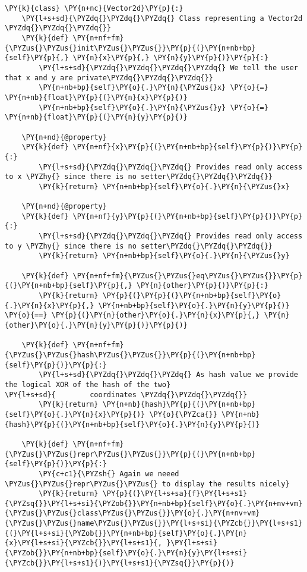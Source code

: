 \begin{Verbatim}[label=\makebox{\url{https://github.com/lucabaldini/cmepda/tree/master/slides/latex/snippets/vector2d\_hashable.py}},commandchars=\\\{\}]
\PY{k}{class} \PY{n+nc}{Vector2d}\PY{p}{:}
    \PY{l+s+sd}{\PYZdq{}\PYZdq{}\PYZdq{} Class representing a Vector2d \PYZdq{}\PYZdq{}\PYZdq{}}
    \PY{k}{def} \PY{n+nf+fm}{\PYZus{}\PYZus{}init\PYZus{}\PYZus{}}\PY{p}{(}\PY{n+nb+bp}{self}\PY{p}{,} \PY{n}{x}\PY{p}{,} \PY{n}{y}\PY{p}{)}\PY{p}{:}
        \PY{l+s+sd}{\PYZdq{}\PYZdq{}\PYZdq{}\PYZdq{} We tell the user that x and y are private\PYZdq{}\PYZdq{}\PYZdq{}}
        \PY{n+nb+bp}{self}\PY{o}{.}\PY{n}{\PYZus{}x} \PY{o}{=} \PY{n+nb}{float}\PY{p}{(}\PY{n}{x}\PY{p}{)}
        \PY{n+nb+bp}{self}\PY{o}{.}\PY{n}{\PYZus{}y} \PY{o}{=} \PY{n+nb}{float}\PY{p}{(}\PY{n}{y}\PY{p}{)}

    \PY{n+nd}{@property}
    \PY{k}{def} \PY{n+nf}{x}\PY{p}{(}\PY{n+nb+bp}{self}\PY{p}{)}\PY{p}{:}
        \PY{l+s+sd}{\PYZdq{}\PYZdq{}\PYZdq{} Provides read only access to x \PYZhy{} since there is no setter\PYZdq{}\PYZdq{}\PYZdq{}}
        \PY{k}{return} \PY{n+nb+bp}{self}\PY{o}{.}\PY{n}{\PYZus{}x}

    \PY{n+nd}{@property}
    \PY{k}{def} \PY{n+nf}{y}\PY{p}{(}\PY{n+nb+bp}{self}\PY{p}{)}\PY{p}{:}
        \PY{l+s+sd}{\PYZdq{}\PYZdq{}\PYZdq{} Provides read only access to y \PYZhy{} since there is no setter\PYZdq{}\PYZdq{}\PYZdq{}}
        \PY{k}{return} \PY{n+nb+bp}{self}\PY{o}{.}\PY{n}{\PYZus{}y}

    \PY{k}{def} \PY{n+nf+fm}{\PYZus{}\PYZus{}eq\PYZus{}\PYZus{}}\PY{p}{(}\PY{n+nb+bp}{self}\PY{p}{,} \PY{n}{other}\PY{p}{)}\PY{p}{:}
        \PY{k}{return} \PY{p}{(}\PY{p}{(}\PY{n+nb+bp}{self}\PY{o}{.}\PY{n}{x}\PY{p}{,} \PY{n+nb+bp}{self}\PY{o}{.}\PY{n}{y}\PY{p}{)} \PY{o}{==} \PY{p}{(}\PY{n}{other}\PY{o}{.}\PY{n}{x}\PY{p}{,} \PY{n}{other}\PY{o}{.}\PY{n}{y}\PY{p}{)}\PY{p}{)}

    \PY{k}{def} \PY{n+nf+fm}{\PYZus{}\PYZus{}hash\PYZus{}\PYZus{}}\PY{p}{(}\PY{n+nb+bp}{self}\PY{p}{)}\PY{p}{:}
        \PY{l+s+sd}{\PYZdq{}\PYZdq{}\PYZdq{} As hash value we provide the logical XOR of the hash of the two}
\PY{l+s+sd}{        coordinates \PYZdq{}\PYZdq{}\PYZdq{}}
        \PY{k}{return} \PY{n+nb}{hash}\PY{p}{(}\PY{n+nb+bp}{self}\PY{o}{.}\PY{n}{x}\PY{p}{)} \PY{o}{\PYZca{}} \PY{n+nb}{hash}\PY{p}{(}\PY{n+nb+bp}{self}\PY{o}{.}\PY{n}{y}\PY{p}{)}

    \PY{k}{def} \PY{n+nf+fm}{\PYZus{}\PYZus{}repr\PYZus{}\PYZus{}}\PY{p}{(}\PY{n+nb+bp}{self}\PY{p}{)}\PY{p}{:}
        \PY{c+c1}{\PYZsh{} Again we neeed \PYZus{}\PYZus{}repr\PYZus{}\PYZus{} to display the results nicely}
        \PY{k}{return} \PY{p}{(}\PY{l+s+sa}{f}\PY{l+s+s1}{\PYZsq{}}\PY{l+s+si}{\PYZob{}}\PY{n+nb+bp}{self}\PY{o}{.}\PY{n+nv+vm}{\PYZus{}\PYZus{}class\PYZus{}\PYZus{}}\PY{o}{.}\PY{n+nv+vm}{\PYZus{}\PYZus{}name\PYZus{}\PYZus{}}\PY{l+s+si}{\PYZcb{}}\PY{l+s+s1}{(}\PY{l+s+si}{\PYZob{}}\PY{n+nb+bp}{self}\PY{o}{.}\PY{n}{x}\PY{l+s+si}{\PYZcb{}}\PY{l+s+s1}{, }\PY{l+s+si}{\PYZob{}}\PY{n+nb+bp}{self}\PY{o}{.}\PY{n}{y}\PY{l+s+si}{\PYZcb{}}\PY{l+s+s1}{)}\PY{l+s+s1}{\PYZsq{}}\PY{p}{)}
\end{Verbatim}